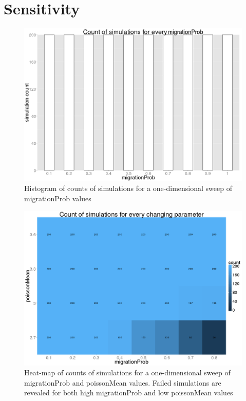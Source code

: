 \documentclass[a4paper,12pt]{report}
\begin{document}
\section{Sensitivity}
\begin{figure}[!ht]
	\centering
	\includegraphics[scale=0.3]{../data/count-1d.png}
	\caption{Histogram of counts of simulations for a one-dimensional sweep of migrationProb values}
	\label{app:count-1d}
\end{figure}

\begin{figure}[!ht]
	\centering
	\includegraphics[scale=0.3]{../data/count-2d.png}
	\caption{Heat-map of counts of simulations for a one-dimensional sweep of migrationProb and poissonMean values. Failed simulations are revealed for both high migrationProb and low poissonMean values}
	\label{app:count-2d}
\end{figure}
\end{document}
